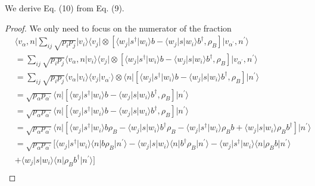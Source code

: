 \documentclass[../../note.tex]{subfiles}
\begin{document}
\begin{lemma}[Eq. (9) to Eq. (10)]
\label{lemma: 9 -> 10}
    We derive Eq. (10) from Eq. (9).
\end{lemma}
\begin{proof}
    We only need to focus on the numerator of the fraction 
    \begin{align}
        &\langle v_{\alpha}, n \vert \sum_{i j} \sqrt{p_i p_j} \vert v_i \rangle \langle v_j \vert \otimes \left[\langle w_j \vert s^\dagger \vert w_i \rangle b - \langle w_j \vert s \vert w_i \rangle  b^\dagger, \rho_B \right] \vert v_{\alpha^\prime}, n^\prime \rangle \\
        &= \sum_{ij} \sqrt{p_i p_j} \langle v_{\alpha}, n \vert v_i \rangle \langle v_j \vert \otimes \left[\langle w_j \vert s^\dagger \vert w_i \rangle b - \langle w_j \vert s \vert w_i \rangle b^\dagger, \rho_B \right] \vert v_{\alpha^\prime},n^\prime \rangle \\
        &= \sum_{ij} \sqrt{p_i p_j} \langle v_{\alpha} \vert v_i \rangle \langle v_j \vert v_{\alpha^\prime} \rangle \otimes \langle n \vert \left[\langle w_j \vert s^\dagger \vert w_i \rangle b - \langle w_j \vert s \vert w_i \rangle b^\dagger, \rho_B \right] \vert n^\prime \rangle \\
        &= \sqrt{p_{\alpha} p_{\alpha^{\prime}}} \langle n \vert \left[\langle w_j \vert s^\dagger \vert w_i \rangle b - \langle w_j \vert s \vert w_i \rangle b^\dagger, \rho_B \right] \vert n^\prime \rangle \\
        &=  \sqrt{p_{\alpha} p_{\alpha^{\prime}}} \langle n \vert \left[\langle w_j \vert s^\dagger \vert w_i \rangle b - \langle w_j \vert s \vert w_i \rangle b^\dagger, \rho_B \right] \vert n^\prime \rangle \\
        &= \sqrt{p_{\alpha} p_{\alpha^\prime}} \langle n \vert \left[ \langle w_j \vert s^\dagger \vert w_i \rangle b \rho_B - \langle w_j \vert s\vert w_i \rangle b^\dagger \rho_B - \langle w_j \vert s^\dagger \vert w_i \rangle \rho_B b + \langle w_j \vert s\vert w_i \rangle \rho_B b^\dagger  \right] \vert n^\prime \rangle \\
        &= \sqrt{p_{\alpha} p_{\alpha^\prime}} [\langle w_j \vert s^\dagger \vert w_i \rangle \langle n \vert b \rho_B \vert n^\prime \rangle - \langle w_j \vert s\vert w_i \rangle \langle n \vert b^\dagger \rho_B \vert n^\prime \rangle - \langle w_j \vert s^\dagger \vert w_i \rangle \langle n \vert \rho_B b \vert n^\prime \rangle \nonumber \\
        &+ \langle w_j \vert s\vert w_i \rangle \langle n \vert \rho_B b^\dagger \vert n^\prime \rangle ] \\

\end{align}
\end{proof}
\end{document}
